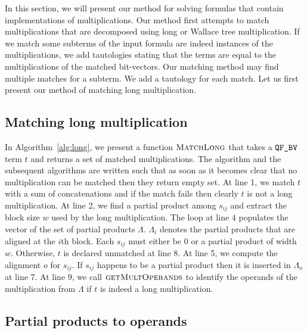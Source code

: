 %
In this section, we will present our method for solving
formulas that contain implementations of multiplications.
%
Our method first attempts to match multiplications that
are decomposed using long or Wallace tree multiplication.
%
If we match some subterms of the input formula
are indeed instances of the
multiplications, we add tautologies stating that the terms are 
equal to the multiplications of the matched bit-vectors.
%
Our matching method may find multiple matches for a subterm.
%
We add a tautology for each match.
%
Let us first present our method of matching long multiplication. 

\subsection{Matching long multiplication}


In Algorithm~\ref{alg:long}, we present a function $\textsc{MatchLong}$
that takes a $\texttt{QF\_BV}$ term $t$ and returns a set of matched multiplications.
%
The algorithm and the subsequent algorithms are written such that as soon
as it becomes clear that no multiplication can be matched then
they return empty set. 
%
At line 1, we match $t$ with a sum of concatenations and if the match fails
then clearly $t$ is not a long multiplication.
%
At line 2, we find a partial product among $s_{ij}$ and extract
the block size $w$ used by the long multiplication.
%
The loop at line $4$ populates the vector of the set of partial products $\Lambda$.
%
$\Lambda_i$ denotes the partial products that are aligned at the $i$th block.
%
Each $s_{ij}$ must either be $0$ or a partial product of width $w$.
%
Otherwise, $t$ is declared unmatched at line 8. 
%
At line 5, we compute the alignment $o$ for $s_{ij}$.
%
If $s_{ij}$ happens to be a partial product then it is inserted in
$\Lambda_o$ at line 7.
%
At line 9, we call $\textsc{getMultOperands}$ to identify the operands
of the multiplication from $\Lambda$ if $t$ is indeed a long
multiplication.

\subsection{Partial products to operands}



